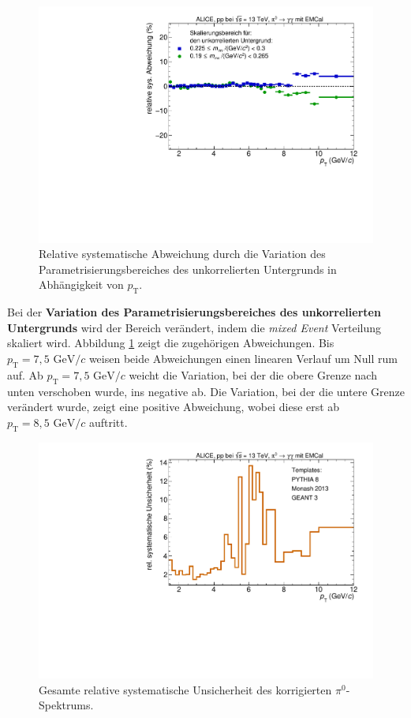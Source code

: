 \begin{figure}[t!]
\centering
\includegraphics[width=.65\linewidth]{YieldsSysUncerUncorrBkgVariation_Data_2016.pdf}
\caption{Relative systematische Abweichung durch die Variation des Parametrisierungsbereiches des unkorrelierten Untergrunds in Abhängigkeit von $p_\text{T}$.}
\label{fig:LeftBkgSys}
\end{figure}
\newline
Bei der \textbf{Variation des Parametrisierungsbereiches des unkorrelierten Untergrunds} wird der Bereich verändert, indem die \textit{mixed Event} Verteilung skaliert wird.
Abbildung \ref{fig:LeftBkgSys} zeigt die zugehörigen Abweichungen.
Bis $p_\text{T} = 7,5 \text{ GeV}/c$ weisen beide Abweichungen einen linearen Verlauf um Null rum auf.
Ab $p_\text{T} = 7,5 \text{ GeV}/c$ weicht die Variation, bei der die obere Grenze nach unten verschoben wurde, ins negative ab.
Die Variation, bei der die untere Grenze verändert wurde, zeigt eine positive Abweichung, wobei diese erst ab $p_\text{T} = 8,5 \text{ GeV}/c$ auftritt.
\begin{figure}[t!]
\centering
\includegraphics[width=.65\linewidth]{SystematischeUnsicherheit_Data_2016.pdf}
\caption{Gesamte relative systematische Unsicherheit des korrigierten $\pi^ {0}$-Spektrums.}
\label{fig:SysUncer}
\end{figure}
\newline
